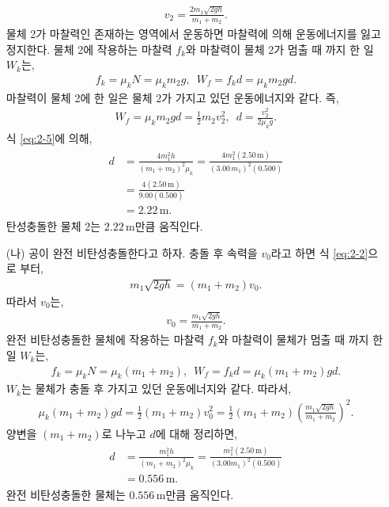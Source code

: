 \documentclass[floatfix,nofootinbib,superscriptaddress,fleqn]{revtex4-2}
\begin{document}
\begin{itemize}
\begin{align}
    v_2 = \frac{2m_1\sqrt{2gh}}{m_1+m_2}.
  \end{align}
  물체 2가 마찰력인 존재하는 영역에서 운동하면 마찰력에 의해 운동에너지를 잃고 정지한다.
  물체 2에 작용하는 마찰력 $f_k$와 마찰력이 물체 2가 멈출 때 까지 한 일 $W_k$는,
  \begin{align}
    f_k = \mu_kN = \mu_km_2g,\,\,\,W_f = f_kd=\mu_km_2gd.
  \end{align}
  마찰력이 물체 2에 한 일은 물체 2가 가지고 있던 운동에너지와 같다. 즉,
  \begin{align}
  W_f =\mu_km_2gd = \frac{1}{2}m_2v_2^2,\,\,\,d=\frac{v_2^2}{2\mu_k g}.
  \end{align}
  식 \eqref{eq:2-5}에 의해,
  \begin{align}
    \begin{split}
      d&=\frac{4m_1^2h}{(m_1+m_2)^2\mu_k}
      =\frac{4m_1^2(2.50\,\mathrm{m})}{(3.00\,m_1)^2(0.500)}   \\
       &=\frac{4(2.50\,\mathrm{m})}{9.00(0.500)}  \\
       &=2.22\,\mathrm{m}.
    \end{split}
  \end{align}
  탄성충돌한 물체 2는 $2.22\,\mathrm{m}$만큼 움직인다.
  \item[(나)] 공이 완전 비탄성충돌한다고 하자. 충돌 후 속력을 $v_0$라고 하면
   식 \eqref{eq:2-2}으로 부터,
  \begin{align}
    m_1\sqrt{2gh} = (m_1 + m_2) v_0.
  \end{align}
  따라서 $v_0$는,
  \begin{align}
    v_0 = \frac{m_1\sqrt{2gh}}{m_1 + m_2}.
  \end{align}
  완전 비탄성충돌한 물체에 작용하는 마찰력 $f_k$와 마찰력이 물체가 멈출 때 까지 
  한 일 $W_k$는,
  \begin{align}
    f_k = \mu_k N = \mu_k(m_1+m_2),\,\,\,W_f = f_kd=\mu_k(m_1+m_2)gd.
  \end{align}
  $W_k$는 물체가 충돌 후 가지고 있던 운동에너지와 같다. 따라서,
  \begin{align}
    \mu_k(m_1+m_2)gd = \frac{1}{2}(m_1+m_2)v^2_0 = \frac{1}{2}(m_1+m_2)
    \left( \frac{m_1\sqrt{2gh}}{m_1 + m_2} \right)^2.
  \end{align}
  양변을 $(m_1+m_2)$로 나누고 $d$에 대해 정리하면,
  \begin{align}
    \begin{split}
      d &= \frac{m_1^2h}{(m_1+m_2)^2\mu_k} 
        = \frac{m_1^2(2.50\,\mathrm{m})}{(3.00m_1)^2(0.500)}  \\
      &= 0.556\,\mathrm{m}.
    \end{split}
  \end{align}
  완전 비탄성충돌한 물체는 $0.556\,\mathrm{m}$만큼 움직인다.
  \end{itemize}
\end{document}
